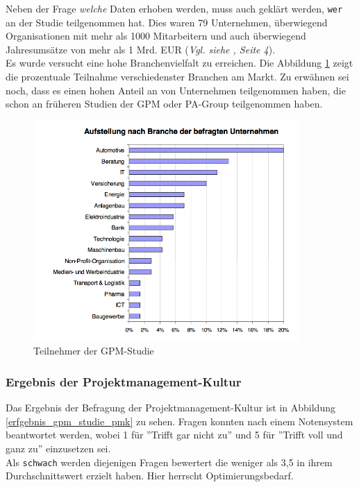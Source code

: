 \documentclass[12pt]{scrartcl}
\begin{document}
Neben der Frage \textit{welche} Daten erhoben werden, muss auch geklärt werden, \texttt{wer} an der Studie teilgenommen hat. Dies waren 79 Unternehmen, überwiegend Organisationen mit mehr als 1000 Mitarbeitern und auch überwiegend Jahresumsätze von mehr als 1 Mrd. EUR (\textit{Vgl. siehe \cite{GPM_Studie_2008}, Seite 4}).\\
Es wurde versucht eine hohe Branchenvielfalt zu erreichen. Die Abbildung \ref{teilnehmer_gpm_studie} zeigt die prozentuale Teilnahme verschiedenster Branchen am Markt. Zu erwähnen sei noch, dass es einen hohen Anteil an von Unternehmen teilgenommen haben, die schon an früheren Studien der GPM oder PA-Group teilgenommen haben. 

\begin{figure}[H]
	\begin{center}
		\includegraphics[width=0.9\textwidth]{img/teilnehmer_gpm_studie}
		\caption{Teilnehmer der GPM-Studie}
		\label{teilnehmer_gpm_studie}	
	\end{center}
\end{figure}

\subsubsection{Ergebnis der Projektmanagement-Kultur}
\label{ergebnis_pmk}
Das Ergebnis der Befragung der Projektmanagement-Kultur ist in Abbildung \ref{erfgebnis_gpm_studie_pmk} zu sehen. Fragen konnten nach einem Notensystem beantwortet werden, wobei 1 für ''Trifft gar nicht zu'' und 5 für ''Trifft voll und ganz zu'' einzusetzen sei. \\
Als \texttt{schwach} werden diejenigen Fragen bewertert die weniger als 3,5 in ihrem Durchschnittswert erzielt haben. Hier herrscht Optimierungsbedarf. 
\end{document}
